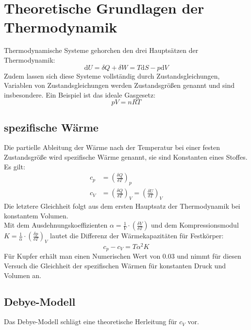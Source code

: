 \documentclass{include/thesisclass3}
\newcommand{\dd}{\text{d}}
\newcommand{\del}{\delta}
\begin{document}
	\FrontMatter
	
	\tableofcontents                  
	\newpage
	\MainMatter

\chapter{Theoretische Grundlagen der Thermodynamik}
Thermodynamische Systeme gehorchen den drei Hauptsätzen der Thermodynamik:
\begin{equation}
\dd U = \del Q + \del W = T\dd S - p \dd V
\end{equation} 
Zudem lassen sich diese Systeme vollständig durch Zustandsgleichungen, Variablen von Zustandsgleichungen werden Zustandsgrößen genannt und sind insbesondere. Ein Beispiel ist das ideale Gasgesetz:
\begin{equation}
pV=nRT
\end{equation}
\section{spezifische Wärme}
Die partielle Ableitung der Wärme nach der Temperatur bei einer festen Zustandsgröße wird spezifische Wärme genannt, sie sind Konstanten eines Stoffes. Es gilt:
\begin{align}
c_p &=\left(\frac{\del Q}{\del T}\right)_p\\
c_V &=\left(\frac{\del Q}{\del T}\right)_V = \left(\frac{\del U}{\del T}\right)_V\label{cv}
\end{align}
Die letztere Gleichheit folgt aus dem ersten Hauptsatz der Thermodynamik bei konstantem Volumen. \\
Mit dem Ausdehnungskoeffizienten $\alpha = \frac{1}{V} \cdot \left(\frac{\del V}{\del T}\right)$ und dem Kompressionsmodul \\$K=\frac{1}{\alpha}\cdot \left(\frac{\del p}{\del T}\right)_V$ lautet die Differenz der Wärmekapazitäten für Festkörper: 
\begin{equation}
c_p-c_V=T\alpha ^2 K
\end{equation}
Für Kupfer erhält man einen Numerischen Wert von 0.03 und nimmt für diesen Versuch die Gleichheit der spezifischen Wärmen für konstanten Druck und Volumen an.

\section{Debye-Modell}
Das Debye-Modell schlägt eine theoretische Herleitung für $c_V$ vor.
\end{document}
